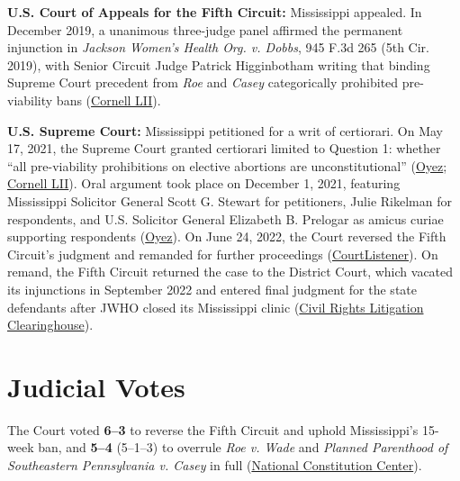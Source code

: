 \documentclass[12pt]{article}
\begin{document}
\textbf{U.S. Court of Appeals for the Fifth Circuit:} Mississippi appealed. In December 2019, a unanimous three-judge panel affirmed the permanent injunction in \textit{Jackson Women's Health Org. v. Dobbs}, 945 F.3d 265 (5th Cir. 2019), with Senior Circuit Judge Patrick Higginbotham writing that binding Supreme Court precedent from \textit{Roe} and \textit{Casey} categorically prohibited pre-viability bans (\href{https://www.law.cornell.edu/supremecourt/text/19-1392}{Cornell LII}).

\textbf{U.S. Supreme Court:} Mississippi petitioned for a writ of certiorari. On May 17, 2021, the Supreme Court granted certiorari limited to Question 1: whether ``all pre-viability prohibitions on elective abortions are unconstitutional'' (\href{https://www.oyez.org/cases/2021/19-1392}{Oyez}; \href{https://www.law.cornell.edu/supremecourt/text/19-1392}{Cornell LII}). Oral argument took place on December 1, 2021, featuring Mississippi Solicitor General Scott G. Stewart for petitioners, Julie Rikelman for respondents, and U.S. Solicitor General Elizabeth B. Prelogar as amicus curiae supporting respondents (\href{https://www.oyez.org/cases/2021/19-1392}{Oyez}). On June 24, 2022, the Court reversed the Fifth Circuit's judgment and remanded for further proceedings (\href{https://www.courtlistener.com/opinion/6481357/dobbs-v-jackson-womens-health-organization/}{CourtListener}). On remand, the Fifth Circuit returned the case to the District Court, which vacated its injunctions in September 2022 and entered final judgment for the state defendants after JWHO closed its Mississippi clinic (\href{https://clearinghouse.net/case/43153/}{Civil Rights Litigation Clearinghouse}).

\section{Judicial Votes}

The Court voted \textbf{6--3} to reverse the Fifth Circuit and uphold Mississippi's 15-week ban, and \textbf{5--4} (5--1--3) to overrule \textit{Roe v. Wade} and \textit{Planned Parenthood of Southeastern Pennsylvania v. Casey} in full (\href{https://constitutioncenter.org/the-constitution/supreme-court-case-library/dobbs-v-jackson-womens-health-organization}{National Constitution Center}).
\end{document}

